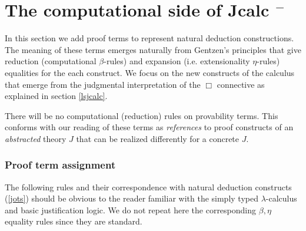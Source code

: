 \chapter{The computational side of Jcalc $^{-}$}
\label{jcalccom}
In this section we add proof terms to represent natural deduction constructions. The  meaning of these terms emerges naturally from Gentzen's principles that give reduction (computational $\beta$-rules) and expansion (i.e. extensionality $\eta$-rules) equalities for the each construct. We focus on the new constructs of the calculus that emerge from the judgmental interpretation of the $\Box$ connective as explained in 
section \ref{lsjcalc}.

There will be no computational (reduction) rules on  provability terms. 
This conforms with our reading of these terms  as \textit{references} to proof constructs of an \textit{abstracted} theory $J$ that can be realized 
differently for a concrete $J$.  
\subsection{Proof term assignment}
\label{basicpras}
The following rules and their correspondence with natural deduction  constructs (\ref{jots}) should be obvious to the reader familiar with the simply typed  $\lambda$-calculus and basic justification logic.
We do not repeat here the corresponding $\beta, \eta$ equality rules since they are standard.
    
